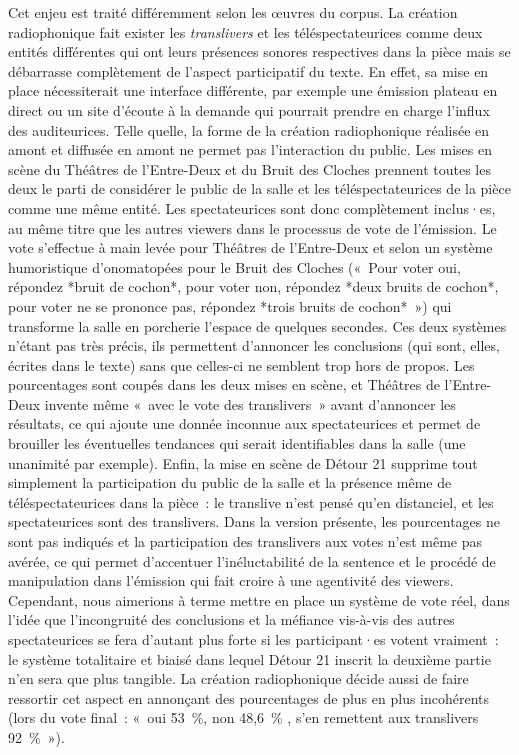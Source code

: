 \documentclass[
]{article}
\begin{document}
Cet enjeu est traité différemment selon les œuvres du corpus. La création radiophonique fait exister les \emph{translivers} et les téléspectateurices comme deux entités différentes qui ont leurs présences sonores respectives dans la pièce mais se débarrasse complètement de l'aspect participatif du texte. En effet, sa mise en place nécessiterait une interface différente, par exemple une émission plateau en direct ou un site d'écoute à la demande qui pourrait prendre en charge l'influx des auditeurices. Telle quelle, la forme de la création radiophonique réalisée en amont et diffusée en amont ne permet pas l'interaction du public. Les mises en scène du Théâtres de l'Entre-Deux et du Bruit des Cloches prennent toutes les deux le parti de considérer le public de la salle et les téléspectateurices de la pièce comme une même entité. Les spectateurices sont donc complètement inclus·es, au même titre que les autres viewers dans le processus de vote de l'émission. Le vote s'effectue à main levée pour Théâtres de l'Entre-Deux et selon un système humoristique d'onomatopées pour le Bruit des Cloches («~Pour voter oui, répondez *bruit de cochon*, pour voter non, répondez *deux bruits de cochon*, pour voter ne se prononce pas, répondez *trois bruits de cochon*~») qui transforme la salle en porcherie l'espace de quelques secondes. Ces deux systèmes n'étant pas très précis, ils permettent d'annoncer les conclusions (qui sont, elles, écrites dans le texte) sans que celles-ci ne semblent trop hors de propos. Les pourcentages sont coupés dans les deux mises en scène, et Théâtres de l'Entre-Deux invente même «~avec le vote des translivers~» avant d'annoncer les résultats, ce qui ajoute une donnée inconnue aux spectateurices et permet de brouiller les éventuelles tendances qui serait identifiables dans la salle (une unanimité par exemple). Enfin, la mise en scène de Détour 21 supprime tout simplement la participation du public de la salle et la présence même de téléspectateurices dans la pièce~: le translive n'est pensé qu'en distanciel, et les spectateurices sont des translivers. Dans la version présente, les pourcentages ne sont pas indiqués et la participation des translivers aux votes n'est même pas avérée, ce qui permet d'accentuer l'inéluctabilité de la sentence et le procédé de manipulation dans l'émission qui fait croire à une agentivité des viewers. Cependant, nous aimerions à terme mettre en place un système de vote réel, dans l'idée que l'incongruité des conclusions et la méfiance vis-à-vis des autres spectateurices se fera d'autant plus forte si les participant·es votent vraiment~: le système totalitaire et biaisé dans lequel Détour 21 inscrit la deuxième partie n'en sera que plus tangible. La création radiophonique décide aussi de faire ressortir cet aspect en annonçant des pourcentages de plus en plus incohérents (lors du vote final~: «~oui 53~\%, non 48,6~\% , s'en remettent aux translivers 92~\%~»).
\end{document}
